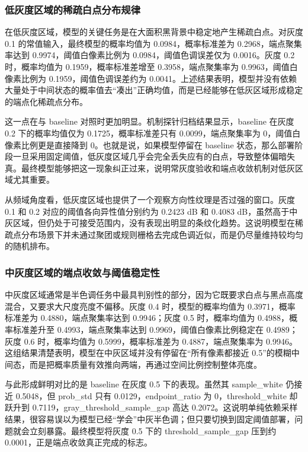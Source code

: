 \documentclass[thesis]{../zstucs-graduation-project}
\begin{document}
\subsubsection{低灰度区域的稀疏白点分布规律}
在低灰度区域，模型的关键任务是在大面积黑背景中稳定地产生稀疏白点。对灰度 0.1 的常值输入，最终模型的概率均值为 0.0984，概率标准差为 0.2968，端点聚集率达到 0.9974，阈值白像素比例为 0.0984，阈值色调误差仅为 0.0016。灰度 0.2 时，概率均值为 0.1959，概率标准差增至 0.3958，端点聚集率为 0.9963，阈值白像素比例为 0.1959，阈值色调误差约为 0.0041。上述结果表明，模型并没有依赖大量处于中间状态的概率值去“凑出”正确均值，而是已经能够在低灰区域形成稳定的端点化稀疏点分布。

这一点在与 baseline 对照时更加明显。机制探针归档结果显示，baseline 在灰度 0.2 下的概率均值仅为 0.1725，概率标准差只有 0.0099，端点聚集率为 0，阈值白像素比例更是直接降到 0。也就是说，如果模型停留在 baseline 状态，那么部署阶段一旦采用固定阈值，低灰度区域几乎会完全丢失应有的白点，导致整体偏暗失真。最终模型能够把这一现象纠正过来，说明常灰度验收和端点收敛机制对低灰区域尤其重要。

从频域角度看，低灰度区域也提供了一个观察方向性纹理是否过强的窗口。灰度 0.1 和 0.2 对应的阈值各向异性值分别约为 0.2423 dB 和 0.4083 dB，虽然高于中灰区域，但仍处于可接受范围内，没有表现出明显的条纹化趋势。这说明模型在稀疏点分布场景下并未通过聚团或规则栅格去完成色调近似，而是仍尽量维持较均匀的随机排布。

\subsubsection{中灰度区域的端点收敛与阈值稳定性}
中灰度区域通常是半色调任务中最具判别性的部分，因为它既要求白点与黑点高度混合，又要求大尺度亮度不偏移。灰度 0.4 时，模型的概率均值为 0.3971，概率标准差为 0.4880，端点聚集率达到 0.9946；灰度 0.5 时，概率均值为 0.4988，概率标准差升至 0.4993，端点聚集率达到 0.9969，阈值白像素比例稳定在 0.4989；灰度 0.6 时，概率均值为 0.5999，概率标准差为 0.4887，端点聚集率为 0.9946。这组结果清楚表明，模型在中灰区域并没有停留在“所有像素都接近 0.5”的模糊中间态，而是把概率质量有效推向两端，再通过空间比例控制整体亮度。

与此形成鲜明对比的是 baseline 在灰度 0.5 下的表现。虽然其 sample\_white 仍接近 0.5048，但 prob\_std 只有 0.0129，endpoint\_ratio 为 0，threshold\_white 却跃升到 0.7119，gray\_threshold\_sample\_gap 高达 0.2072。这说明单纯依赖采样结果，很容易误以为模型已经“学会”中灰半色调；但只要切换到固定阈值部署，问题就会立刻暴露。最终模型将灰度 0.5 下的 threshold\_sample\_gap 压到约 0.0001，正是端点收敛真正完成的标志。
\end{document}
